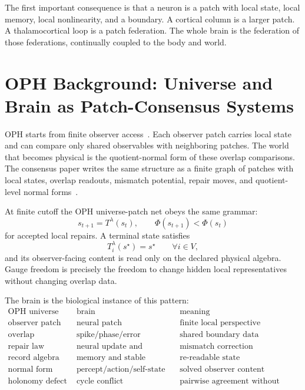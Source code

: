 \documentclass[11pt]{article}
\theoremstyle{remark}
\theoremstyle{plain}
\begin{document}
The first important consequence is that a neuron is a patch with local state, local memory, local nonlinearity, and a boundary. A cortical column is a larger patch. A thalamocortical loop is a patch federation. The whole brain is the federation of those federations, continually coupled to the body and world.

\section{OPH Background: Universe and Brain as Patch-Consensus Systems}

OPH starts from finite observer access~\cite{ObserversAreAllYouNeed}. Each observer patch carries local state and can compare only shared observables with neighboring patches. The world that becomes physical is the quotient-normal form of these overlap comparisons. The consensus paper writes the same structure as a finite graph of patches with local states, overlap readouts, mismatch potential, repair moves, and quotient-level normal forms~\cite{RealityAsConsensusProtocol}.

At finite cutoff the OPH universe-patch net obeys the same grammar:
\[
s_{t+1}=T^\lambda(s_t),
\qquad
\Phi(s_{t+1})<\Phi(s_t)
\]
for accepted local repairs. A terminal state satisfies
\[
T_i^\lambda(s^\star)=s^\star
\qquad\forall i\in V,
\]
and its observer-facing content is read only on the declared physical algebra. Gauge freedom is precisely the freedom to change hidden local representatives without changing overlap data.

The brain is the biological instance of this pattern:
\[
\begin{array}{ccc}
\text{OPH universe} & \text{brain} & \text{meaning}\\
\hline
\text{observer patch} & \text{neural patch} & \text{finite local perspective}\\
\text{overlap observable} & \text{spike/phase/error interface} & \text{shared boundary data}\\
\text{repair law} & \text{neural update and plasticity} & \text{mismatch correction}\\
\text{record algebra} & \text{memory and stable activity} & \text{re-readable state}\\
\text{normal form} & \text{percept/action/self-state} & \text{solved observer content}\\
\text{holonomy defect} & \text{cycle conflict} & \text{pairwise agreement without global fit}
\end{array}
\]
\end{document}
